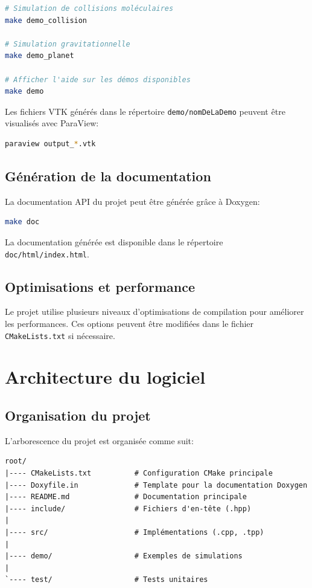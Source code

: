 \documentclass[12pt,a4paper]{article}
\begin{document}
\begin{lstlisting}[language=bash]
# Simulation de collisions moléculaires
make demo_collision

# Simulation gravitationnelle
make demo_planet

# Afficher l'aide sur les démos disponibles
make demo
\end{lstlisting}

Les fichiers VTK générés dans le répertoire \texttt{demo/nomDeLaDemo} peuvent être visualisés avec ParaView:

\begin{lstlisting}[language=bash]
paraview output_*.vtk
\end{lstlisting}

\subsection{Génération de la documentation}

La documentation API du projet peut être générée grâce à Doxygen:

\begin{lstlisting}[language=bash]
make doc
\end{lstlisting}

La documentation générée est disponible dans le répertoire \texttt{doc/html/index.html}.

\subsection{Optimisations et performance}

Le projet utilise plusieurs niveaux d'optimisations de compilation pour améliorer les performances. Ces options peuvent être modifiées dans le fichier \texttt{CMakeLists.txt} si nécessaire.

\section{Architecture du logiciel}

\subsection{Organisation du projet}

L'arborescence du projet est organisée comme suit:

\begin{verbatim}
root/
|---- CMakeLists.txt          # Configuration CMake principale
|---- Doxyfile.in             # Template pour la documentation Doxygen
|---- README.md               # Documentation principale
|---- include/                # Fichiers d'en-tête (.hpp)
|
|---- src/                    # Implémentations (.cpp, .tpp)
|
|---- demo/                   # Exemples de simulations
|
`---- test/                   # Tests unitaires
\end{verbatim}
\end{document}
